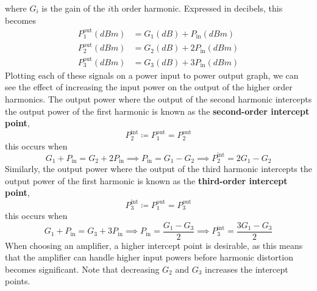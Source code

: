 \documentclass{article}
\begin{document}
where \(G_i\) is the gain of the \(i\)th order harmonic. Expressed in
decibels, this becomes
\begin{align*}
    P_1^{\mathrm{out}} (\unit{dBm}) & = G_1 (\unit{dB}) + P_{\mathrm{in}} (\unit{dBm})  \\
    P_2^{\mathrm{out}} (\unit{dBm}) & = G_2 (\unit{dB}) + 2P_{\mathrm{in}} (\unit{dBm}) \\
    P_3^{\mathrm{out}} (\unit{dBm}) & = G_3 (\unit{dB}) + 3P_{\mathrm{in}} (\unit{dBm})
\end{align*}
Plotting each of these signals on a power input to power output graph,
we can see the effect of increasing the input power on the output of
the higher order harmonics. The output power where the output of the
second harmonic intercepts the output power of the first harmonic is
known as the \textbf{second-order intercept point},
\begin{equation*}
    P_2^{\mathrm{int}} \coloneq P_1^{\mathrm{out}} = P_2^{\mathrm{out}}
\end{equation*}
this occurs when
\begin{equation*}
    G_1 + P_{\mathrm{in}} = G_2 + 2P_{\mathrm{in}} \implies P_{\mathrm{in}} = G_1 - G_2 \implies P_2^{\mathrm{int}} = 2G_1 - G_2
\end{equation*}
Similarly, the output power where the output of the third harmonic
intercepts the output power of the first harmonic is known as the
\textbf{third-order intercept point},
\begin{equation*}
    P_3^{\mathrm{int}} \coloneq P_1^{\mathrm{out}} = P_3^{\mathrm{out}}
\end{equation*}
this occurs when
\begin{equation*}
    G_1 + P_{\mathrm{in}} = G_3 + 3P_{\mathrm{in}} \implies P_{\mathrm{in}} = \frac{G_1 - G_3}{2} \implies P_3^{\mathrm{int}} = \frac{3G_1 - G_3}{2}
\end{equation*}
When choosing an amplifier, a higher intercept point is desirable, as
this means that the amplifier can handle higher input powers before
harmonic distortion becomes significant. Note that decreasing \(G_2\)
and \(G_3\) increases the intercept points.
\end{document}
